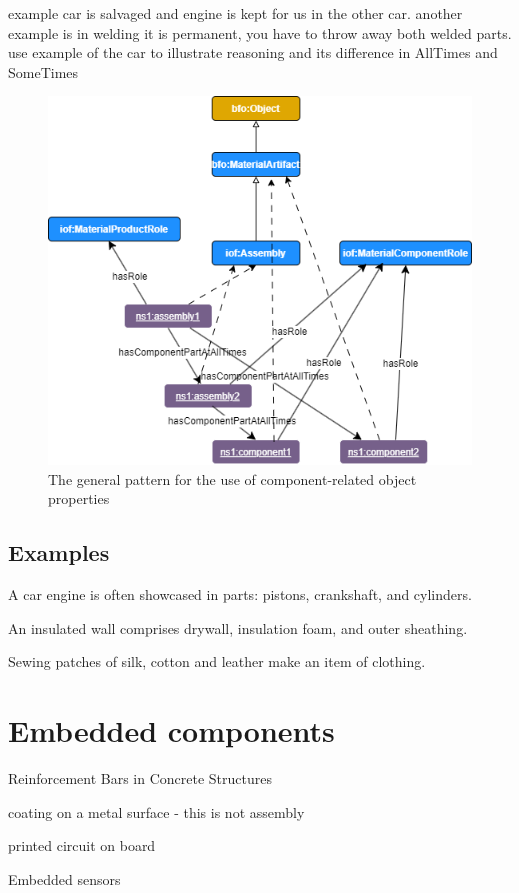 example car is salvaged and engine is kept for us in the other car. 
another example is in welding it is permanent, you have to throw away both welded parts. 
use example of the car to illustrate reasoning and its difference in AllTimes and SomeTimes
\begin{figure}
\includegraphics[scale=0.5]{scenarios/assemblies-components/images/assembly-components-generic.png}
\caption{The general pattern for the use of component-related object properties} 
\label{gen-pttn-components}
\end{figure}


\subsection*{Examples}

A car engine is often showcased in parts: pistons, crankshaft, and cylinders.

An insulated wall comprises drywall, insulation foam, and outer sheathing.

Sewing patches of silk, cotton and leather make an item of clothing.

\section{Embedded components}

Reinforcement Bars in Concrete Structures

coating on a metal surface - this is not assembly

printed circuit on board

Embedded sensors